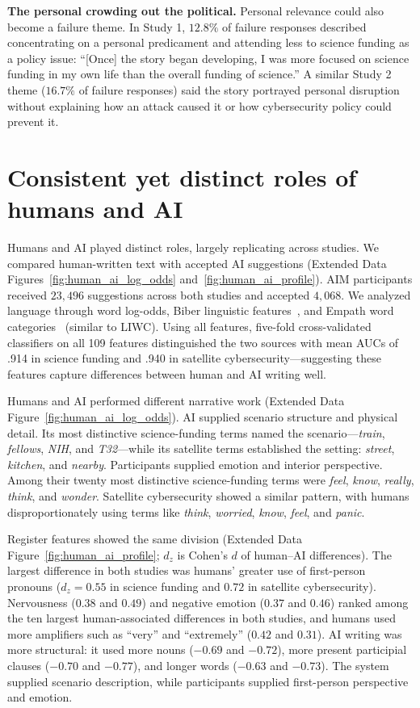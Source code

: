 \documentclass[11pt]{article}
\begin{document}
\textbf{The personal crowding out the political.} Personal relevance could also become a failure theme. In Study 1, $12.8\%$ of failure responses described concentrating on a personal predicament and attending less to science funding as a policy issue: ``[Once] the story began developing, I was more focused on science funding in my own life than the overall funding of science.'' A similar Study 2 theme ($16.7\%$ of failure responses) said the story portrayed personal disruption without explaining how an attack caused it or how cybersecurity policy could prevent it.


\section{Consistent yet distinct roles of humans and AI}
\label{sec:linguistic-results}

Humans and AI played distinct roles, largely replicating across studies. We compared human-written text with accepted AI suggestions (Extended Data Figures~\ref{fig:human_ai_log_odds} and~\ref{fig:human_ai_profile}). AIM participants received $23{,}496$ suggestions across both studies and accepted $4{,}068$. We analyzed language through word log-odds, Biber linguistic features~\cite{biber_using_1993}, and Empath word categories~\cite{fast_empath_2016} (similar to LIWC). Using all features, five-fold cross-validated classifiers on all 109 features distinguished the two sources with mean AUCs of .914 in science funding and .940 in satellite cybersecurity---suggesting these features capture differences between human and AI writing well.

Humans and AI performed different narrative work (Extended Data Figure~\ref{fig:human_ai_log_odds}). AI supplied scenario structure and physical detail. Its most distinctive science-funding terms named the scenario---\textit{train}, \textit{fellows}, \textit{NIH}, and \textit{T32}---while its satellite terms established the setting: \textit{street}, \textit{kitchen}, and \textit{nearby}. Participants supplied emotion and interior perspective. Among their twenty most distinctive science-funding terms were \textit{feel}, \textit{know}, \textit{really}, \textit{think}, and \textit{wonder}. Satellite cybersecurity showed a similar pattern, with humans disproportionately using terms like \textit{think}, \textit{worried}, \textit{know}, \textit{feel}, and \textit{panic}.

Register features showed the same division (Extended Data Figure~\ref{fig:human_ai_profile}; $d_z$ is Cohen's $d$ of human--AI differences). The largest difference in both studies was humans' greater use of first-person pronouns ($d_z=0.55$ in science funding and $0.72$ in satellite cybersecurity). Nervousness ($0.38$ and $0.49$) and negative emotion ($0.37$ and $0.46$) ranked among the ten largest human-associated differences in both studies, and humans used more amplifiers such as ``very'' and ``extremely'' ($0.42$ and $0.31$). AI writing was more structural: it used more nouns ($-0.69$ and $-0.72$), more present participial clauses ($-0.70$ and $-0.77$), and longer words ($-0.63$ and $-0.73$). The system supplied scenario description, while participants supplied first-person perspective and emotion.
\end{document}
